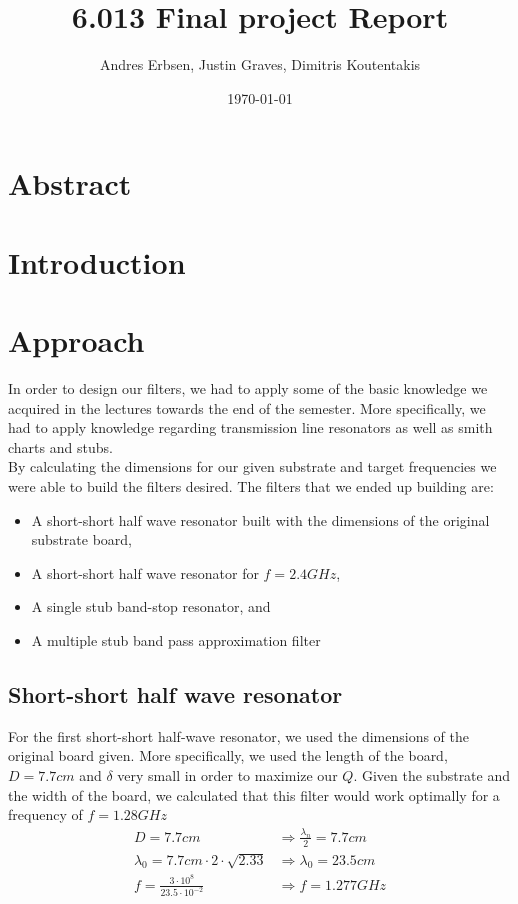\documentclass[letterpaper, 12pt]{article}
\begin{document}
\title{6.013 Final project Report}
\author{Andres Erbsen, Justin Graves, Dimitris Koutentakis}
\date{\today}
\maketitle
\vspace{5mm}
\tableofcontents
\clearpage
\section{Abstract}
\section {Introduction}
\section{Approach}
In order to design our filters, we had to apply some of the basic knowledge we acquired in the lectures towards the end of the semester. More specifically, we had to apply knowledge regarding transmission line resonators as well as smith charts and stubs.
\\
By calculating the dimensions for our given substrate and target frequencies we were able to build the filters desired. The filters that we ended up building are:
\begin{itemize}
    \item A short-short half wave resonator built with the dimensions of the original substrate board,
    \item A short-short half wave resonator for $f=2.4 GHz$,
    \item A single stub band-stop resonator, and
    \item A multiple stub band pass approximation filter
\end{itemize}
\subsection{Short-short half wave resonator}
For the first short-short half-wave resonator, we used the dimensions of the original board given. More specifically, we used the length of the board, $D=7.7cm$ and $\delta$ very small in order to maximize our $Q$. Given the substrate and the width of the board, we calculated that this filter would work optimally for a frequency of $f=1.28 GHz$
\begin{align*}
    D=7.7cm &\Rightarrow \frac{\lambda_n}{2}=7.7cm \\
    \lambda_0=7.7cm\cdot2\cdot\sqrt{2.33}&\Rightarrow \lambda_0=23.5cm \\
    f=\frac{3\cdot10^{8}}{23.5\cdot10^{-2}} &\Rightarrow f=1.277 GHz
\end{align*}
\end{document}
